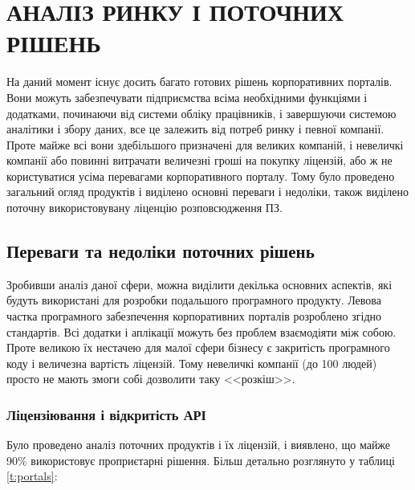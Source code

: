 \section{АНАЛІЗ РИНКУ І ПОТОЧНИХ РІШЕНЬ}
На даний момент існує досить багато готових рішень корпоративних порталів. 
Вони можуть забезпечувати підприємства всіма необхідними функціями і додатками, починаючи від системи обліку працівників, і завершуючи системою аналітики і збору даних, все це залежить від потреб ринку і певної компанії.
Проте майже всі вони здебільшого призначені для великих компаній, і невеличкі компанії або повинні витрачати величезні гроші на покупку ліцензій, або ж не користуватися усіма перевагами корпоративного порталу.
Тому було проведено загальний огляд продуктів і виділено основні переваги і недоліки, також виділено поточну використовувану ліценцію розповсюдження ПЗ.
\subsection{Переваги та недоліки поточних рішень}
Зробивши аналіз даної сфери, можна виділити декілька основних аспектів, які будуть використані для розробки подальшого програмного продукту.
Левова частка програмного забезпечення корпоративних порталів розроблено згідно стандартів\cite{portlet2}. 
Всі додатки і аплікації можуть без проблем взаємодіяти між собою. 
Проте великою їх нестачею для малої сфери бізнесу є закритість програмного коду і величезна вартість ліцензій.
Тому невеличкі компанії (до 100 людей) просто не мають змоги собі дозволити таку <<розкіш>>.

\subsubsection{Ліцензіювання і відкритість АРІ}
\par Було проведено аналіз поточних продуктів і їх ліцензій, і виявлено, що майже 90\% використовує проприєтарні рішення.
Більш детально розглянуто у таблиці \ref{t:portals}:

